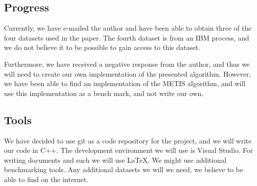 \documentclass[a4paper,11pt]{article}
\begin{document}
\subsection{Progress}
Currently, we have e-mailed the author and have been able to obtain three of the four datasets used in the paper. The fourth dataset is from an IBM process, and we do not believe it to be possible to gain access to this dataset. 

Furthermore, we have received a negative response from the author, and thus we will need to create our own implementation of the presented algorithm. However, we have been able to find an implementation of the METIS algorithm, and will use this implementation as a bench mark, and not write our own. 



\subsection{Tools} 
We have decided to use git as a code repository for the project, and we will write our code in C++. The development environment we will use is Visual Studio. For writing documents and such we will use \LaTeX. We might use additional benchmarking tools. Any additional datasets we will we need, we believe to be able to find on the internet. 
\end{document}
